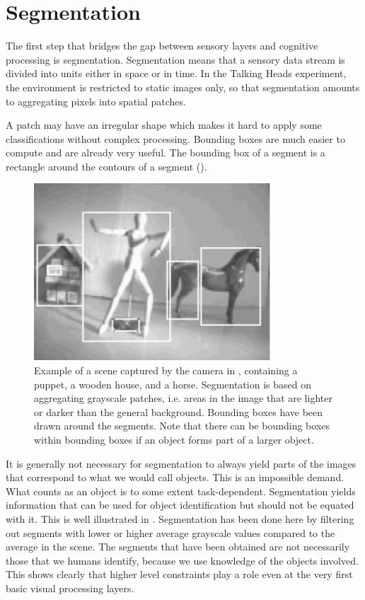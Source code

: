 \section{Segmentation} 

The first step that bridges the gap between sensory layers and 
cognitive processing is segmentation. Segmentation means that 
a sensory data stream is divided into units 
either in space or in time. In the Talking Heads experiment, 
the environment is restricted to
static images only, so that segmentation
amounts to aggregating pixels into spatial patches.

A patch may have an irregular shape which makes it hard to apply 
some classifications without complex processing. Bounding boxes are much 
easier to compute and are already very useful. The bounding box of a segment 
is a rectangle around the contours of a segment (). 

\begin{figure}[htbp]
  \centerline{\includegraphics[width=.50\textwidth]{chap3/figs/sslang.pdf}}
\label{screenshot}
\caption{Example of a scene captured by the 
camera in , containing a puppet, a
wooden house, and a horse. Segmentation is based on aggregating grayscale
patches, i.e. areas in the image that are lighter or darker than the 
general background. Bounding boxes have been drawn around the segments. 
Note that there can be bounding boxes within bounding boxes if an object 
forms part of a larger object. 
\label{f:boundbox}}
\end{figure}

It is generally not necessary for segmentation to always yield parts of the images that correspond
to what we would call objects. This is an impossible demand. What counts as 
an object is to some extent task-dependent. 
Segmentation yields information that can be used for 
object identification but should not be equated with it. 
This is well illustrated in . 
Segmentation has been done here by filtering out segments with 
lower or higher average grayscale values compared to the 
average in the scene. The segments that have been obtained
are not necessarily those that we humans identify, because we
use knowledge of the objects involved. This 
shows clearly that higher level constraints play a role 
even at the very first basic visual processing layers. 

